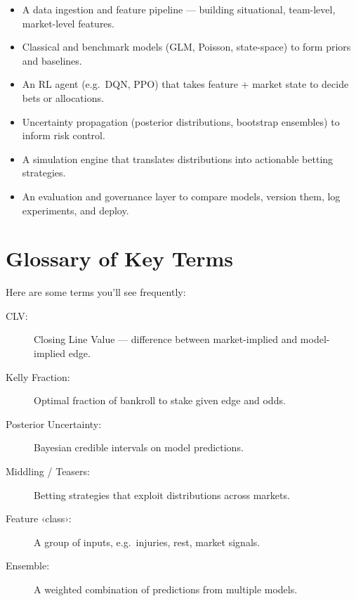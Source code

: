 \begin{itemize}
  \item A data ingestion and feature pipeline — building situational, team-level, market-level features.
  \item Classical and benchmark models (GLM, Poisson, state-space) to form priors and baselines.
  \item An RL agent (e.g.\ DQN, PPO) that takes feature + market state to decide bets or allocations.
  \item Uncertainty propagation (posterior distributions, bootstrap ensembles) to inform risk control.
  \item A simulation engine that translates distributions into actionable betting strategies.
  \item An evaluation and governance layer to compare models, version them, log experiments, and deploy.
\end{itemize}



\section{Glossary of Key Terms}

Here are some terms you’ll see frequently:
\begin{description}
  \item[CLV:] Closing Line Value — difference between market-implied and model-implied edge.
  \item[Kelly Fraction:] Optimal fraction of bankroll to stake given edge and odds.
  \item[Posterior Uncertainty:] Bayesian credible intervals on model predictions.
  \item[Middling / Teasers:] Betting strategies that exploit distributions across markets.
  \item[Feature ‹class›:] A group of inputs, e.g.\ injuries, rest, market signals.
  \item[Ensemble:] A weighted combination of predictions from multiple models.
\end{description}


